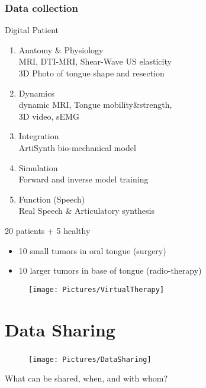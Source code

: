 \documentclass[xcolor=dvipsnames]{beamer}
\begin{document}
\begin{frame}
	\frametitle{Data collection}

	\noindent
	\begin{minipage}[t]{0.50\linewidth}
		Digital Patient
	  	\begin{enumerate}[1]
	  	\item Anatomy \& Physiology\\
				{\footnotesize MRI, DTI-MRI, Shear-Wave US elasticity\\
				3D Photo of tongue shape and resection}
	  	\item Dynamics\\
				{\footnotesize dynamic MRI, Tongue mobility\&strength, \\
				3D video, sEMG}
	  	\item Integration\\
				{\footnotesize ArtiSynth bio-mechanical model}
	  	\item Simulation\\
				{\footnotesize Forward and inverse model training}
	  	\item Function (Speech)\\
				{\footnotesize Real Speech \& Articulatory synthesis}
	  	\end{enumerate}
	
	\end{minipage}
	\hfill%
	\begin{minipage}[t]{0.45\linewidth}
			20 patients + 5 healthy
			\begin{itemize}
			\item 10 small tumors in oral tongue (surgery)
			\item 10 larger tumors in base of tongue (radio-therapy) 
			\end{itemize}
		
			\begin{figure}
			\texttt{[image: Pictures/VirtualTherapy]}
			\end{figure}
	\end{minipage}

\end{frame}

\section{Data Sharing}

\begin{frame}
	\frametitle{\insertsection}
		
	\begin{center}
	\begin{figure}[l]
     \texttt{[image: Pictures/DataSharing]}
	\end{figure}
	{\large What can be shared, when, and with whom?}
	\end{center}
\end{frame}
\end{document}
